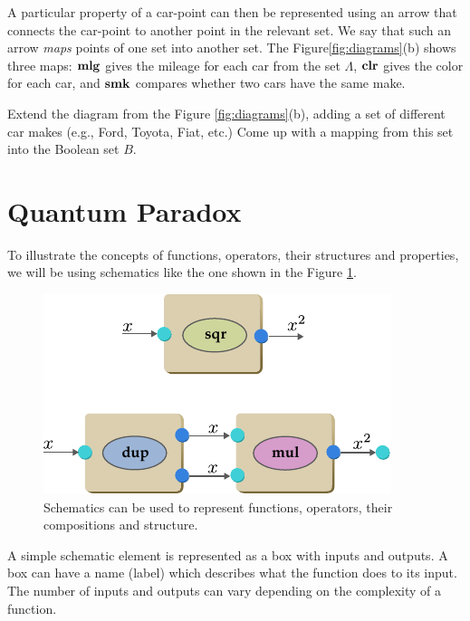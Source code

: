 A particular property of a car-point
can then be represented using an arrow that connects the car-point to
another point in the relevant set. We say that such an arrow \emph{maps}
points of one set into another set. The Figure\ref{fig:diagrams}(b)
shows three maps: $\textrm{\bf mlg}$ gives the mileage for each car from the
set $\Lambda$, $\textrm{\bf clr}$ gives the color for each car, and
$\textrm{\bf smk}$ compares whether two cars have the same make.

\begin{exercise}
Extend the diagram from the Figure \ref{fig:diagrams}(b), adding a set
of different car makes (e.g., Ford, Toyota, Fiat, etc.) Come up with a
mapping from this set into the Boolean set $B$.
\label{exe:carMakesSet}
\end{exercise}

\section{Quantum Paradox}
To illustrate the concepts of functions, operators, their structures and
properties, we will be using schematics like the one
shown in the Figure \ref{fig:schematicExample}.
\begin{figure}%
  \includegraphics[scale=1.0]{schematicExample}
  \caption{Schematics can be used to represent functions, operators,
    their compositions and structure.}
  \label{fig:schematicExample}
\end{figure}

A simple schematic element is represented as a box with inputs
and outputs. A box can have a name (label) which describes what the
function does to its input.  The number of inputs and
outputs can vary depending on the complexity of a function.

